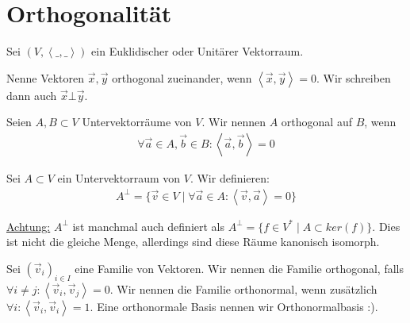 \documentclass{report}
\newcommand*{\newpar}{\par\vspace{\baselineskip}\noindent}
\newcommand{\ul}[1]{\underline{#1}}
\newcommand{\vv}{\vec{v}}
\newcommand{\vx}{\vec{x}}
\newcommand{\vy}{\vec{y}}
\newcommand{\scalar}[2]{\left\langle #1, #2 \right\rangle}
\begin{document}
\section{Orthogonalität}
Sei $(V, \scalar{\_}{\_})$ ein Euklidischer oder Unitärer Vektorraum.
\begin{definition}
 Nenne Vektoren $\vx, \vy$ orthogonal zueinander, wenn $\scalar{\vx}{\vy} = 0$. Wir schreiben dann auch $\vx \bot \vy$.
\end{definition}
\begin{definition}
 Seien $A, B \subset V$ Untervektorräume von $V$. Wir nennen $A$ orthogonal auf $B$, wenn
 \begin{align*}
  \forall \vec{a} \in A, \vec{b} \in B : \scalar{\vec{a}}{\vec{b}} = 0
 \end{align*}
\end{definition}
\begin{definition}
 Sei $A \subset V$ ein Untervektorraum von $V$. Wir definieren:
 \begin{align*}
  A^\bot = \{\vv \in V \mid \forall \vec{a} \in A : \scalar{\vv}{\vec{a}} = 0\}
 \end{align*}
\end{definition}
\newpar
\ul{Achtung:} $A^{\bot}$ ist manchmal auch definiert als $A^\bot = \{f \in V^* \mid A \subset ker(f)\}$. Dies ist nicht die gleiche Menge, allerdings sind diese Räume kanonisch isomorph.
\begin{definition}
 Sei $(\vv_i)_{i \in I}$ eine Familie von Vektoren. Wir nennen die Familie orthogonal, falls $\forall i \neq j : \scalar{\vv_i}{\vv_j} = 0$. Wir nennen die Familie orthonormal, wenn zusätzlich $\forall i : \scalar{\vv_i}{\vv_i} = 1$. Eine orthonormale Basis nennen wir Orthonormalbasis :).
\end{definition}
\end{document}
